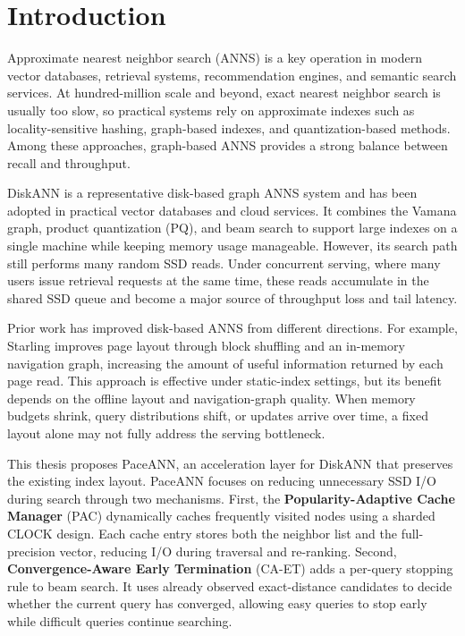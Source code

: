 \chapter{Introduction}
\label{ch:intro}

Approximate nearest neighbor search (ANNS) is a key operation in modern vector databases, retrieval systems, recommendation engines, and semantic search services.
At hundred-million scale and beyond, exact nearest neighbor search is usually too slow, so practical systems rely on approximate indexes such as locality-sensitive hashing\cite{datar2004lsh}, graph-based indexes\cite{malkov2020hnsw,fu2019nsg}, and quantization-based methods\cite{jegou2011pq}.
Among these approaches, graph-based ANNS provides a strong balance between recall and throughput\cite{subramanya2019diskann,chen2021spann}.

DiskANN is a representative disk-based graph ANNS system and has been adopted in practical vector databases and cloud services\cite{wang2021milvus,upreti2025cosmos}.
It combines the Vamana graph, product quantization (PQ), and beam search to support large indexes on a single machine while keeping memory usage manageable.
However, its search path still performs many random SSD reads.
Under concurrent serving, where many users issue retrieval requests at the same time, these reads accumulate in the shared SSD queue and become a major source of throughput loss and tail latency\cite{subramanya2019diskann}.

Prior work has improved disk-based ANNS from different directions.
For example, Starling improves page layout through block shuffling and an in-memory navigation graph, increasing the amount of useful information returned by each page read\cite{wang2024starling}.
This approach is effective under static-index settings, but its benefit depends on the offline layout and navigation-graph quality.
When memory budgets shrink, query distributions shift, or updates arrive over time, a fixed layout alone may not fully address the serving bottleneck.

This thesis proposes PaceANN, an acceleration layer for DiskANN that preserves the existing index layout.
PaceANN focuses on reducing unnecessary SSD I/O during search through two mechanisms.
First, the \textbf{Popularity-Adaptive Cache Manager} (PAC) dynamically caches frequently visited nodes using a sharded CLOCK design.
Each cache entry stores both the neighbor list and the full-precision vector, reducing I/O during traversal and re-ranking.
Second, \textbf{Convergence-Aware Early Termination} (CA-ET) adds a per-query stopping rule to beam search.
It uses already observed exact-distance candidates to decide whether the current query has converged, allowing easy queries to stop early while difficult queries continue searching\cite{li2020adaptiveet,chatzakis2025darth,teofili2025patience}.

